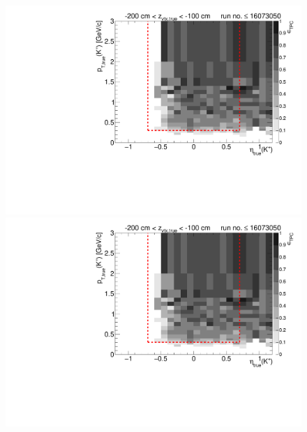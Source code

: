 \begin{figure}[hb]
{  \includegraphics[width=\linewidth,page=16]{graphics/eff/Eff2D_TPC_kaon_Plus_RunRange1.pdf}\\
  \includegraphics[width=\linewidth,page=18]{graphics/eff/Eff2D_TPC_kaon_Plus_RunRange1.pdf}
}%
\end{figure}



